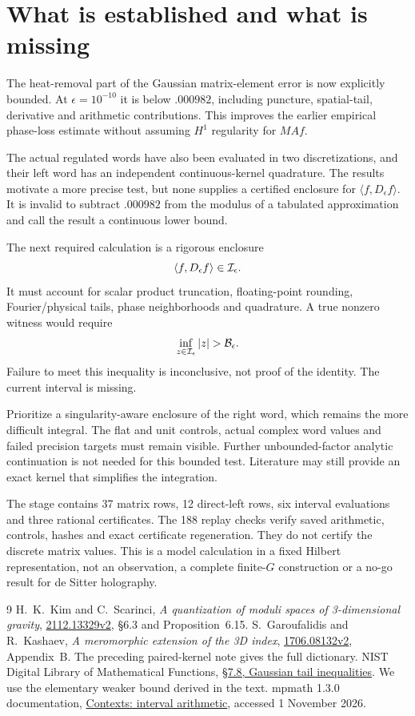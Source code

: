 \documentclass[11pt,a4paper]{article}
\newcommand{\eps}{\epsilon}
\begin{document}
\newpage
\section{What is established and what is missing}
The heat-removal part of the Gaussian matrix-element error is now
explicitly bounded. At $\eps=10^{-10}$ it is below $.000982$,
including puncture, spatial-tail, derivative and arithmetic
contributions. This improves the earlier empirical phase-loss
estimate without assuming $H^1$ regularity for $MAf$.

The actual regulated words have also been evaluated in two
discretizations, and their left word has an independent
continuous-kernel quadrature. The results motivate a more precise
test, but none supplies a certified enclosure for
$\langle f,D_\eps f\rangle$. It is invalid to subtract $.000982$
from the modulus of a tabulated approximation and call the result
a continuous lower bound.

The next required calculation is a rigorous enclosure
\[
 \langle f,D_\eps f\rangle\in {\cal I}_\eps .
\]
It must account for scalar product truncation, floating-point
rounding, Fourier/physical tails, phase neighborhoods and quadrature.
A true nonzero witness would require
\[
 \inf_{z\in{\cal I}_\eps}|z|>{\cal B}_\eps .
\]
Failure to meet this inequality is inconclusive, not proof of the
identity. The current interval is missing.

Prioritize a singularity-aware enclosure of the right word, which
remains the more difficult integral. The flat and unit controls,
actual complex word values and failed precision targets must remain
visible. Further unbounded-factor analytic continuation is not
needed for this bounded test. Literature may still provide an exact
kernel that simplifies the integration.

The stage contains 37 matrix rows, 12 direct-left rows, six interval
evaluations and three rational certificates. The 188 replay checks
verify saved arithmetic, controls, hashes and exact certificate
regeneration. They do not certify the discrete matrix values.
This is a model calculation in a fixed Hilbert representation,
not an observation, a complete finite-$G$ construction or a no-go
result for de Sitter holography.

\begin{thebibliography}{9}\small
{} H.~K.~Kim and C.~Scarinci,
\emph{A quantization of moduli spaces of 3-dimensional gravity},
\href{https://arxiv.org/abs/2112.13329v2}{2112.13329v2},
\S6.3 and Proposition~6.15.
 S.~Garoufalidis and R.~Kashaev,
\emph{A meromorphic extension of the 3D index},
\href{https://arxiv.org/abs/1706.08132v2}{1706.08132v2},
Appendix~B. The preceding paired-kernel note gives the full dictionary.
 NIST Digital Library of Mathematical Functions,
\href{https://dlmf.nist.gov/7.8}{\S7.8, Gaussian tail inequalities}.
We use the elementary weaker bound derived in the text.
 mpmath 1.3.0 documentation,
\href{https://mpmath.readthedocs.io/en/1.3.0/contexts.html}
{Contexts: interval arithmetic}, accessed 1 November 2026.
\end{thebibliography}
\end{document}
